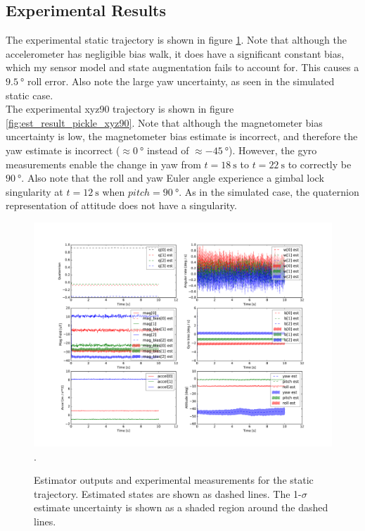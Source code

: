 \documentclass[conference]{IEEEtran}
\begin{document}
\subsection{Experimental Results}
The experimental static trajectory is shown in figure \ref{fig:est_result_pickle_static}. Note that although the accelerometer has negligible bias walk, it does have a significant constant bias, which my sensor model and state augmentation fails to account for. This causes a $\SI{9.5}{\degree}$ roll error. Also note the large yaw uncertainty, as seen in the simulated static case.\\

The experimental xyz90 trajectory is shown in figure \ref{fig:est_result_pickle_xyz90}. Note that although the magnetometer bias uncertainty is low, the magnetometer bias estimate is incorrect, and therefore the yaw estimate is incorrect ($\approx \SI{0}{\degree}$ instead of $\approx \SI{-45}{\degree}$). However, the gyro measurements enable the change in yaw from $t = \SI{18}{\second}$ to $t = \SI{22}{\second}$ to correctly be $\SI{90}{\degree}$. Also note that the roll and yaw Euler angle experience a gimbal lock singularity at $t = \SI{12}{\second}$ when $pitch=\SI{90}{\degree}$. As in the simulated case, the quaternion representation of attitude does not have a singularity. 

\begin{figure}[!t]
  \centering
  \includegraphics[width=8in]{figures/est_result_pickle_static.pdf}
  \DeclareGraphicsExtensions.
  \caption{Estimator outputs and experimental measurements for the static trajectory. Estimated states are shown as dashed lines. The 1-$\sigma$ estimate uncertainty is shown as a shaded region around the dashed lines.}
  \label{fig:est_result_pickle_static}
\end{figure}
\end{document}
